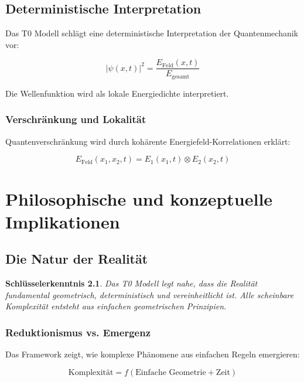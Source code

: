 \documentclass[12pt,a4paper]{report}
\newtheorem{erkenntnis}{Schlüsselerkenntnis}[chapter]
\begin{document}
	\section{Deterministische Interpretation}
	
	Das T0 Modell schlägt eine deterministische Interpretation der Quantenmechanik vor:
	
	\begin{equation}
		|\psi(x,t)|^2 = \frac{E_{\text{Feld}}(x,t)}{E_{\text{gesamt}}}
	\end{equation}
	
	Die Wellenfunktion wird als lokale Energiedichte interpretiert.
	
	\subsection{Verschränkung und Lokalität}
	
	Quantenverschränkung wird durch kohärente Energiefeld-Korrelationen erklärt:
	
	\begin{equation}
		E_{\text{Feld}}(x_1, x_2, t) = E_1(x_1,t) \otimes E_2(x_2,t)
	\end{equation}
	
	\chapter{Philosophische und konzeptuelle Implikationen}
	
	\section{Die Natur der Realität}
	
	\begin{erkenntnis}
		Das T0 Modell legt nahe, dass die Realität fundamental geometrisch, deterministisch und vereinheitlicht ist. Alle scheinbare Komplexität entsteht aus einfachen geometrischen Prinzipien.
	\end{erkenntnis}
	
	\subsection{Reduktionismus vs. Emergenz}
	
	Das Framework zeigt, wie komplexe Phänomene aus einfachen Regeln emergieren:
	
	\begin{equation}
		\text{Komplexität} = f(\text{Einfache Geometrie} + \text{Zeit})
	\end{equation}
	
\end{document}
